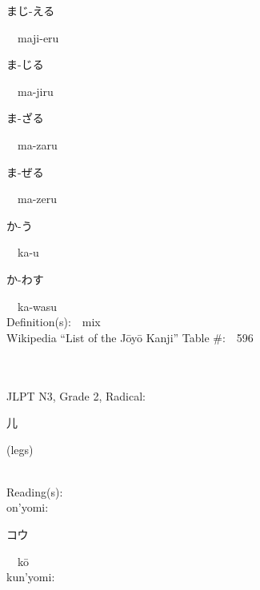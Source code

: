 \begin{multicols}{2}
{\hspace*{2em}}{\begin{CJK}{UTF8}{min} まじ-える \end{CJK}}\ \ maji-eru\ \ \\
{\hspace*{2em}}{\begin{CJK}{UTF8}{min} ま-じる \end{CJK}}\ \ ma-jiru\ \ \\
{\hspace*{2em}}{\begin{CJK}{UTF8}{min} ま-ざる \end{CJK}}\ \ ma-zaru\ \ \\
{\hspace*{2em}}{\begin{CJK}{UTF8}{min} ま-ぜる \end{CJK}}\ \ ma-zeru\ \ \\
{\hspace*{2em}}{\begin{CJK}{UTF8}{min} か-う \end{CJK}}\ \ ka-u\ \ \\
{\hspace*{2em}}{\begin{CJK}{UTF8}{min} か-わす \end{CJK}}\ \ ka-wasu\ \ \\
Definition(s):\ \ mix \\
Wikipedia ``List of the J\=oy\=o Kanji'' Table \#:\ \ 596 \\
\ \ \\
{\fontsize{34pt}{40pt}  }\ \ \\  %
{JLPT N3, Grade 2, Radical:\ \ {\begin{CJK}{UTF8}{min} 儿 \end{CJK}} (legs) } \\
Reading(s):\ \ \\
{\hspace*{1em}}on'yomi:\ \ \\
{\hspace*{2em}}{\begin{CJK}{UTF8}{min} コウ \end{CJK}}\ \ k\=o\ \ \\
{\hspace*{1em}}kun'yomi:\ \ \\

\end{multicols}

